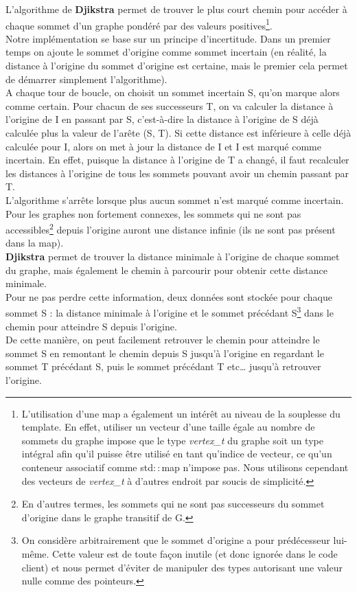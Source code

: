 \documentclass[12pt]{article}
\begin{document}
L'algorithme de {\bf Djikstra} permet de trouver le plus court chemin pour accéder à chaque sommet d'un graphe pondéré par des valeurs positives\footnote{L'utilisation d'une map a également un intérêt au niveau de la souplesse du template. En effet, utiliser un vecteur d'une taille égale au nombre de sommets du graphe impose que le type {\it vertex\_t} du graphe soit un type intégral afin qu'il puisse être utilisé en tant qu'indice de vecteur, ce qu'un conteneur associatif comme std$::$map n'impose pas.
Nous utilisons cependant des vecteurs de {\it vertex\_t} à d'autres endroit par soucis de simplicité.}. \\

Notre implémentation se base sur un principe d'incertitude. Dans un premier temps on ajoute le sommet d'origine comme sommet incertain (en réalité, la distance à l'origine du sommet d'origine est certaine, mais le premier cela permet de démarrer simplement l'algorithme). \\

A chaque tour de boucle, on choisit un sommet incertain S, qu'on marque alors comme certain. Pour chacun de ses successeurs T, on va calculer la distance à l'origine de I en passant par S, c’est-à-dire la distance à l'origine de S déjà calculée plus la valeur de l'arête (S, T). Si cette distance est inférieure à celle déjà calculée pour I, alors on met à jour la distance de I et I est marqué comme incertain. En effet, puisque la distance à l'origine de T a changé, il faut recalculer les distances à l'origine de tous les sommets pouvant avoir un chemin passant par T. \\

L'algorithme s'arrête lorsque plus aucun sommet n'est marqué comme incertain. Pour les graphes non fortement connexes, les sommets qui ne sont pas accessibles\footnote{En d'autres termes, les sommets qui ne sont pas successeurs du sommet d'origine dans le graphe transitif de G.} depuis l'origine auront une distance infinie (ils ne sont pas présent dans la map). \\

{\bf Djikstra} permet de trouver la distance minimale à l'origine de chaque sommet du graphe, mais également le chemin à parcourir pour obtenir cette distance minimale. \\

Pour ne pas perdre cette information, deux données sont stockée pour chaque sommet S : la distance minimale à l'origine et le sommet précédant S\footnote{On considère arbitrairement que le sommet d'origine a pour prédécesseur lui-même. Cette valeur est de toute façon inutile (et donc ignorée dans le code client) et nous permet d'éviter de manipuler des types autorisant une valeur nulle comme des pointeurs.}  dans le chemin pour atteindre S depuis l'origine. \\
\clearpage
De cette manière, on peut facilement retrouver le chemin pour atteindre le sommet S en remontant le chemin depuis S jusqu'à l'origine en regardant le sommet T précédant S, puis le sommet précédant T etc… jusqu'à retrouver l'origine.  \\
\end{document}
